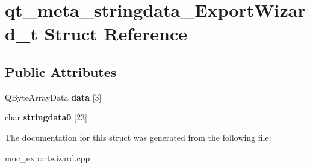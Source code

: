 \hypertarget{structqt__meta__stringdata___export_wizard__t}{}\section{qt\+\_\+meta\+\_\+stringdata\+\_\+\+Export\+Wizard\+\_\+t Struct Reference}
\label{structqt__meta__stringdata___export_wizard__t}
\subsection*{Public Attributes}
\begin{DoxyCompactItemize}
\item 
\hypertarget{structqt__meta__stringdata___export_wizard__t_a1c867d90aee99510b6673a23b1b54a57}{}Q\+Byte\+Array\+Data {\bfseries data} \mbox{[}3\mbox{]}\label{structqt__meta__stringdata___export_wizard__t_a1c867d90aee99510b6673a23b1b54a57}

\item 
\hypertarget{structqt__meta__stringdata___export_wizard__t_a7b6c20a6eb31458665043f44482ac81d}{}char {\bfseries stringdata0} \mbox{[}23\mbox{]}\label{structqt__meta__stringdata___export_wizard__t_a7b6c20a6eb31458665043f44482ac81d}

\end{DoxyCompactItemize}


The documentation for this struct was generated from the following file\+:\begin{DoxyCompactItemize}
\item 
moc\+\_\+exportwizard.\+cpp\end{DoxyCompactItemize}
